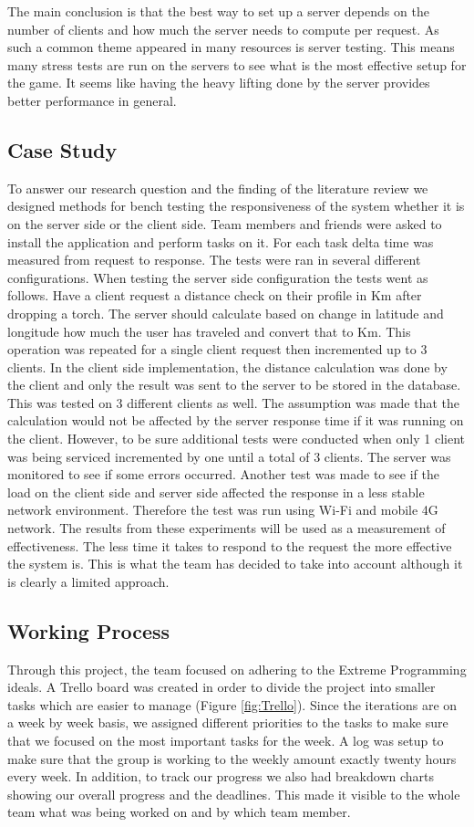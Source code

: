 \documentclass[12pt,a4paper,twoside]{report}
\begin{document}
The main conclusion is that the best way to set up a server depends on the number of clients and how much the server needs to compute per request. As such a common theme appeared in many resources is server testing. This means many stress tests are run on the servers to see what is the most effective setup for the game. It seems like having the heavy lifting done by the server provides better performance in general.
\newpage
\subsection{Case Study}
To answer our research question and the finding of the literature review we designed methods for bench testing the responsiveness of the system whether it is on the server side or the client side. Team members and friends were asked to install the application and perform tasks on it. For each task delta time was measured from request to response. The tests were ran in several different configurations. When testing the server side configuration the tests went as follows. Have a client request a distance check on their profile in Km after dropping a torch. The server should calculate based on change in latitude and longitude how much the user has traveled and convert that to Km. This operation was repeated for a single client request then incremented up to 3 clients. In the client side implementation, the distance calculation was done by the client and only the result was sent to the server to be stored in the database. This was tested on 3 different clients as well. The assumption was made that the calculation would not be affected by the server response time if it was running on the client. However, to be sure additional tests were conducted when only 1 client was being serviced incremented by one until a total of 3 clients. The server was monitored to see if some errors occurred. Another test was made to see if the load on the client side and server side affected the response in a less stable network environment. Therefore the test was run using Wi-Fi and mobile 4G network. The results from these experiments will be used as a measurement of effectiveness. The less time it takes to respond to the request the more effective the system is. This is what the team has decided to take into account although it is clearly a limited approach.

\subsection{Working Process}
Through this project, the team focused on adhering to the Extreme Programming ideals. A Trello board was created in order to divide the project into smaller tasks which are easier to manage (Figure \ref{fig:Trello}). Since the iterations are on a week by week basis, we assigned  different priorities to the tasks to make sure that we focused on the most important tasks for the week. A log was setup to make sure that the group is working to the weekly amount exactly twenty hours every week. In addition, to track our progress we also had breakdown charts showing our overall progress and the deadlines. This made it visible to the whole team what was being worked on and by which team member.
\end{document}

